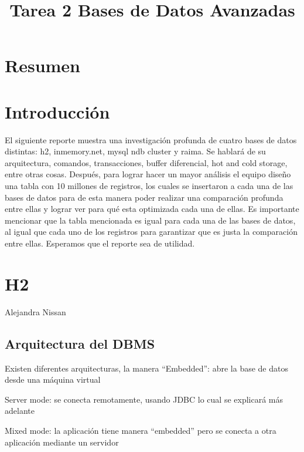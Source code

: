 \documentclass{acmart}
\title{Tarea 2 Bases de Datos Avanzadas}
\begin{document}
\maketitle

\tableofcontents

\section{Resumen}

\section{Introducción}
El siguiente reporte muestra una investigación profunda de cuatro bases de datos distintas: h2, inmemory.net, mysql ndb cluster y raima. Se hablará de su arquitectura, comandos, transacciones, buffer diferencial, hot and cold storage, entre otras cosas. Después, para lograr hacer un mayor análisis el equipo diseño una tabla  con 10 millones de registros, los cuales se insertaron a cada una de las bases de datos para de esta manera poder realizar una comparación profunda entre ellas y lograr ver para qué esta optimizada cada una de ellas. Es importante mencionar que la tabla mencionada es igual para cada una de las bases de datos, al igual que cada uno de los registros para garantizar que es justa la comparación entre ellas. Esperamos que el reporte sea de utilidad. 

\section{H2}

Alejandra Nissan 



\subsection{Arquitectura del DBMS}

Existen diferentes arquitecturas, la manera “Embedded”: abre la base de datos desde una máquina virtual





Server mode: se conecta remotamente, usando JDBC lo cual se explicará más adelante

 



Mixed mode: la aplicación tiene manera “embedded” pero se conecta a otra aplicación mediante un servidor
\end{document}

